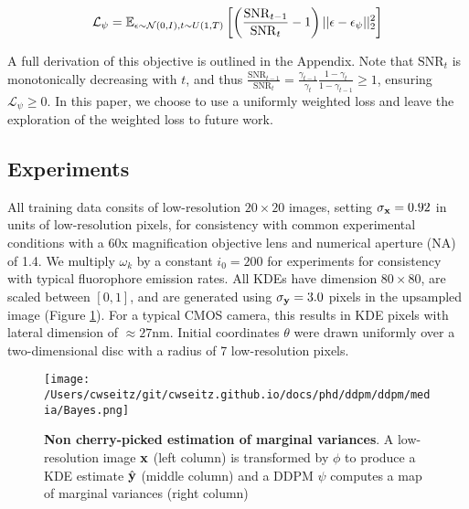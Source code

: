 \begin{equation}
\mathcal{L}_{\psi} = \mathbb{E}_{\epsilon\sim \mathcal{N}(0,I),t\sim U(1,T)}\left[\left(\frac{\mathrm{SNR}_{t-1}}{{\mathrm{SNR}_{t}}}-1\right)\lvert\lvert \bold{\epsilon}-\bold{\epsilon}_{\psi}\lvert\lvert_{2}^{2}\right]
\end{equation}

A full derivation of this objective is outlined in the Appendix. Note that $\mathrm{SNR}_{t}$ is monotonically decreasing with $t$, and thus $\frac{\mathrm{SNR}_{t-1}}{{\mathrm{SNR}_{t}}} = \frac{\gamma_{t-1}}{\gamma_{t}}\frac{1-\gamma_{t}}{1-\gamma_{t-1}} \geq 1$, ensuring $\mathcal{L}_{\psi}\geq 0$. In this paper, we choose to use a uniformly weighted loss and leave the exploration of the weighted loss to future work.

\subsection{Experiments}

All training data consits of low-resolution $20\times 20$ images, setting $\sigma_{\bold{x}}=0.92$ in units of low-resolution pixels, for consistency with common experimental conditions with a 60x magnification objective lens and numerical aperture (NA) of 1.4. We multiply $\omega_{k}$ by a constant $i_{0}=200$ for experiments for consistency with typical fluorophore emission rates. All KDEs have dimension $80\times 80$, are scaled between $[0,1]$, and are generated using $\sigma_{\bold{y}}=3.0$ pixels in the upsampled image (Figure \ref{fig:fig12}). For a typical CMOS camera, this results in KDE pixels with lateral dimension of $\approx 27\mathrm{nm}$. Initial coordinates $\theta$ were drawn uniformly over a two-dimensional disc with a radius of 7 low-resolution pixels.


\begin{figure}
\centering
\texttt{[image: /Users/cwseitz/git/cwseitz.github.io/docs/phd/ddpm/ddpm/media/Bayes.png]}
\caption{\textbf{Non cherry-picked estimation of marginal variances}. A low-resolution image $\bold{x}$ (left column) is transformed by $\phi$ to produce a KDE estimate $\hat{\bold{y}}$ (middle column) and a DDPM $\psi$ computes a map of marginal variances (right column)}
\label{fig:fig12}
\end{figure}

